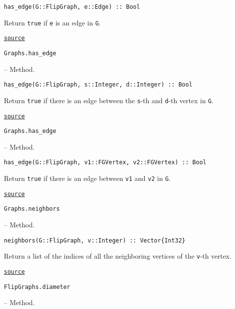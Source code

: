 \begin{adjustwidth}{2em}{0pt}


\begin{verbatim}
has_edge(G::FlipGraph, e::Edge) :: Bool
\end{verbatim}

Return \texttt{true} if \texttt{e} is an edge in \texttt{G}.



\href{https://github.com/schto223/FlipGraphs.jl/blob/490c01a7adf74b42f27dda05099165c47ae8133e/src/flipGraph.jl#L184-L188}{\texttt{source}}


\end{adjustwidth}
\hypertarget{8874867711328913772}{\texttt{Graphs.has\_edge}}  -- {Method.}

\begin{adjustwidth}{2em}{0pt}


\begin{verbatim}
has_edge(G::FlipGraph, s::Integer, d::Integer) :: Bool
\end{verbatim}

Return \texttt{true} if there is an edge between the \texttt{s}-th and \texttt{d}-th vertex in \texttt{G}.



\href{https://github.com/schto223/FlipGraphs.jl/blob/490c01a7adf74b42f27dda05099165c47ae8133e/src/flipGraph.jl#L191-L195}{\texttt{source}}


\end{adjustwidth}
\hypertarget{14525428844387179697}{\texttt{Graphs.has\_edge}}  -- {Method.}

\begin{adjustwidth}{2em}{0pt}


\begin{verbatim}
has_edge(G::FlipGraph, v1::FGVertex, v2::FGVertex) :: Bool
\end{verbatim}

Return \texttt{true} if there is an edge between \texttt{v1} and \texttt{v2} in \texttt{G}.



\href{https://github.com/schto223/FlipGraphs.jl/blob/490c01a7adf74b42f27dda05099165c47ae8133e/src/flipGraph.jl#L198-L202}{\texttt{source}}


\end{adjustwidth}
\hypertarget{10601523073478244094}{\texttt{Graphs.neighbors}}  -- {Method.}

\begin{adjustwidth}{2em}{0pt}


\begin{verbatim}
neighbors(G::FlipGraph, v::Integer) :: Vector{Int32}
\end{verbatim}

Return a list of the indices of all the neighboring vertices of the \texttt{v}-th vertex.



\href{https://github.com/schto223/FlipGraphs.jl/blob/490c01a7adf74b42f27dda05099165c47ae8133e/src/flipGraph.jl#L212-L216}{\texttt{source}}


\end{adjustwidth}
\hypertarget{18322570677264282309}{\texttt{FlipGraphs.diameter}}  -- {Method.}

